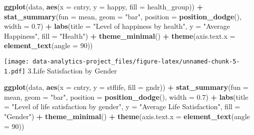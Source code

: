 \documentclass[
]{article}
\newenvironment{Shaded}{\begin{snugshade}}{\end{snugshade}}
\newcommand{\AttributeTok}[1]{\textcolor[rgb]{0.13,0.29,0.53}{#1}}
\newcommand{\DecValTok}[1]{\textcolor[rgb]{0.00,0.00,0.81}{#1}}
\newcommand{\FloatTok}[1]{\textcolor[rgb]{0.00,0.00,0.81}{#1}}
\newcommand{\FunctionTok}[1]{\textcolor[rgb]{0.13,0.29,0.53}{\textbf{#1}}}
\newcommand{\NormalTok}[1]{#1}
\newcommand{\SpecialCharTok}[1]{\textcolor[rgb]{0.81,0.36,0.00}{\textbf{#1}}}
\newcommand{\StringTok}[1]{\textcolor[rgb]{0.31,0.60,0.02}{#1}}
\begin{document}
\begin{Shaded}
\begin{Highlighting}[]
\FunctionTok{ggplot}\NormalTok{(data, }\FunctionTok{aes}\NormalTok{(}\AttributeTok{x =}\NormalTok{ cntry, }\AttributeTok{y =}\NormalTok{ happy, }\AttributeTok{fill =}\NormalTok{ health\_group)) }\SpecialCharTok{+}
  \FunctionTok{stat\_summary}\NormalTok{(}\AttributeTok{fun =}\NormalTok{ mean, }\AttributeTok{geom =} \StringTok{"bar"}\NormalTok{, }\AttributeTok{position =} \FunctionTok{position\_dodge}\NormalTok{(), }\AttributeTok{width =} \FloatTok{0.7}\NormalTok{) }\SpecialCharTok{+}
  \FunctionTok{labs}\NormalTok{(}\AttributeTok{title =} \StringTok{"Level of happiness by health"}\NormalTok{, }\AttributeTok{y =} \StringTok{"Average Happiness"}\NormalTok{, }\AttributeTok{fill =} \StringTok{"Health"}\NormalTok{) }\SpecialCharTok{+}
  \FunctionTok{theme\_minimal}\NormalTok{() }\SpecialCharTok{+}
  \FunctionTok{theme}\NormalTok{(}\AttributeTok{axis.text.x =} \FunctionTok{element\_text}\NormalTok{(}\AttributeTok{angle =} \DecValTok{90}\NormalTok{))}
\end{Highlighting}
\end{Shaded}

\texttt{[image: data-analytics-project\_files/figure-latex/unnamed-chunk-5-1.pdf]}
3.Life Satisfaction by Gender

\begin{Shaded}
\begin{Highlighting}[]
\FunctionTok{ggplot}\NormalTok{(data, }\FunctionTok{aes}\NormalTok{(}\AttributeTok{x =}\NormalTok{ cntry, }\AttributeTok{y =}\NormalTok{ stflife, }\AttributeTok{fill =}\NormalTok{ gndr)) }\SpecialCharTok{+}
  \FunctionTok{stat\_summary}\NormalTok{(}\AttributeTok{fun =}\NormalTok{ mean, }\AttributeTok{geom =} \StringTok{"bar"}\NormalTok{, }\AttributeTok{position =} \FunctionTok{position\_dodge}\NormalTok{(), }\AttributeTok{width =} \FloatTok{0.7}\NormalTok{) }\SpecialCharTok{+}
  \FunctionTok{labs}\NormalTok{(}\AttributeTok{title =} \StringTok{"Level of life satisfaction by gender"}\NormalTok{, }\AttributeTok{y =} \StringTok{"Average Life Satisfaction"}\NormalTok{, }\AttributeTok{fill =} \StringTok{"Gender"}\NormalTok{) }\SpecialCharTok{+}
  \FunctionTok{theme\_minimal}\NormalTok{() }\SpecialCharTok{+}
  \FunctionTok{theme}\NormalTok{(}\AttributeTok{axis.text.x =} \FunctionTok{element\_text}\NormalTok{(}\AttributeTok{angle =} \DecValTok{90}\NormalTok{))}
\end{Highlighting}
\end{Shaded}
\end{document}
